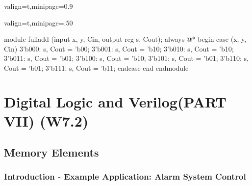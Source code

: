 \documentclass[12pt,openany]{book}
\begin{document}
\vfill
\begin{adjustbox}{valign=t,minipage={0.9\textwidth}}
\hfill
\noindent
\begin{adjustbox}{valign=t,minipage={.50\textwidth}}
\small
\begin{vhdl}
module fulladd (input x, y, Cin, output reg s, Cout);
	always @*
	begin
		case ({x, y, Cin})
		3'b000: {s, Cout} = 'b00;
		3'b001: {s, Cout} = 'b10;
		3'b010: {s, Cout} = 'b10;
		3'b011: {s, Cout} = 'b01;
		3'b100: {s, Cout} = 'b10;
		3'b101: {s, Cout} = 'b01;
		3'b110: {s, Cout} = 'b01;
		3'b111: {s, Cout} = 'b11;
		endcase
	end
endmodule
\end{vhdl}
\end{adjustbox}
\end{adjustbox}


\chapter{Digital Logic and Verilog(PART VII) (W7.2)}

\section{Memory Elements}
\subsection{Introduction - Example Application: Alarm System Control}
\end{document}
